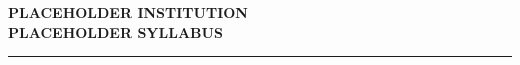 \documentclass[11pt, letterpaper, oneside]{article}
\newcommand{\Institution}{PLACEHOLDER INSTITUTION}
\newcommand{\Syllabus}{PLACEHOLDER SYLLABUS}
\begin{document}
\begin{center}
    {\large\bfseries \Institution} \\
    \vspace{4pt}
    \textbf{\Syllabus} \\
    \rule{\textwidth}{1pt}
\end{center}

\vspace{10pt}



\vspace{10pt}



\end{document}
